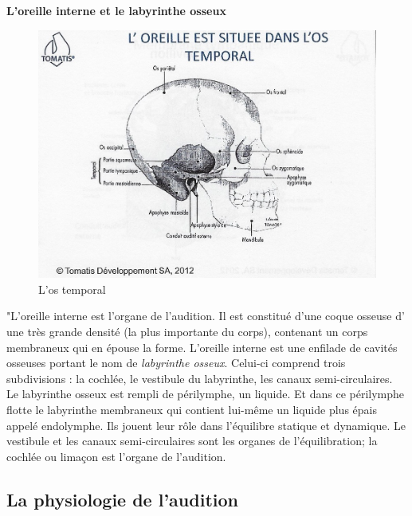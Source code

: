 \textbf{L'oreille interne et le labyrinthe osseux}

\begin{figure}
	\centering
	\includegraphics[width=0.7\linewidth]{images/Loreilleostemporal_crane.jpg}
	\caption[L'os temporal]{L'os temporal}
	\label{fig:loreilleostemporal18}
\end{figure}

"L'oreille interne est l'organe de l'audition. Il
est constitué d'une coque osseuse d' une très grande densité (la plus
importante du corps), contenant un corps membraneux qui en épouse
la forme.
L'oreille interne est une enfilade de cavités osseuses portant
le nom de \emph{labyrinthe osseux}. Celui-ci comprend trois subdivisions :
la cochlée, le vestibule du labyrinthe, les canaux semi-circulaires.
Le labyrinthe
osseux est rempli de périlymphe, un liquide. Et dans ce périlymphe
flotte le labyrinthe membraneux qui contient lui-même un liquide
plus épais appelé endolymphe. Ils jouent leur rôle dans l'équilibre
statique et dynamique. Le vestibule et les canaux semi-circulaires
sont les organes de l'équilibration; la cochlée ou
limaçon est l'organe de l'audition.



\subsection{La physiologie de l'audition}


